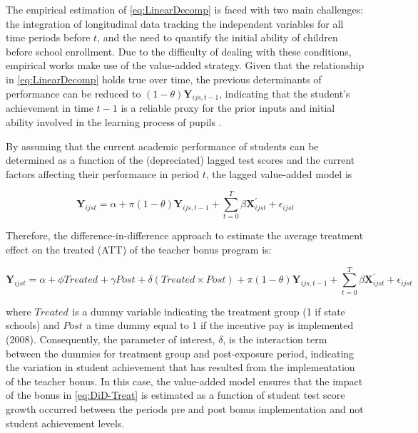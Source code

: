 \documentclass[a4paper, 12pt]{article}
\begin{document}
The empirical estimation of \eqref{eq:LinearDecomp} is faced with two main challenges: the integration of longitudinal data tracking the independent variables for all time periods before $t$, and the need to quantify the initial ability of children before school enrollment. Due to the difficulty of dealing with these conditions, empirical works make use of the value-added strategy. Given that the relationship in \eqref{eq:LinearDecomp} holds true over time, the previous determinants of performance can be reduced to $(1 - \theta) \mathbf{Y}_{ijs,t-1}$, indicating that the student's achievement in time $t-1$ is a reliable proxy for the prior inputs and initial ability involved in the learning process of pupils \citep{hanushek2012distribution, rothstein2010teacher, andrabi2009value}.

By assuming that the current academic performance of students can be determined as a function of the (depreciated) lagged test scores and the current factors affecting their performance in period $t$, the lagged value-added model is


\begin{equation} \label{eq:value-added}
\mathbf{Y}_{ijst} = \alpha + \pi (1 - \theta) \mathbf{Y}_{ijs,t-1} + \sum_{t=0}^T \beta \mathbf{X}_{ijst}^{\prime} + \epsilon_{ijst} 
\end{equation}


Therefore, the difference-in-difference approach to estimate the average treatment effect on the treated (ATT) of the teacher bonus program is:


\begin{equation} \label{eq:DiD-Treat}
\mathbf{Y}_{ijst} = \alpha + \phi Treated_{} + \gamma Post_{} + \delta (Treated \times Post)_{} + \pi (1 - \theta) \mathbf{Y}_{ijs,t-1} + \sum_{t=0}^T \beta \mathbf{X}_{ijst}^{\prime} + \epsilon_{ijst} 
\end{equation}



where $Treated_{}$ is a dummy variable indicating the treatment group (1 if state schools) and $Post_{}$ a time dummy equal to 1 if the incentive pay is implemented (2008). Consequently, the parameter of interest, $\delta$, is the interaction term between the dummies for treatment group and post-exposure period, indicating the variation in student achievement that has resulted from the implementation of the teacher bonus. In this case, the value-added model ensures that the impact of the bonus in \eqref{eq:DiD-Treat} is estimated as a function of student test score growth \textemdash occurred between the periods pre and post bonus implementation \textemdash and not student achievement levels.
\end{document}
